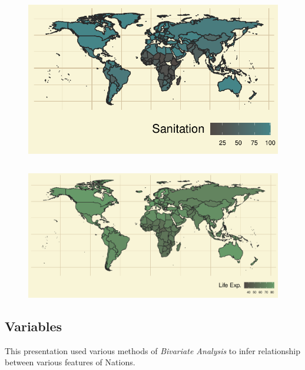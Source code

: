 \documentclass[
]{article}
\begin{document}
\begin{figure}

\includegraphics{main_files/figure-pdf/unnamed-chunk-4-1.pdf} \hfill{}

\end{figure}

\[
~
\]

\begin{figure}

\includegraphics{main_files/figure-pdf/unnamed-chunk-5-1.pdf} \hfill{}

\end{figure}

\hypertarget{variables}{%
\subsection{Variables}\label{variables}}

This presentation used various methods of \emph{Bivariate Analysis} to
infer relationship between various features of Nations.
\end{document}
